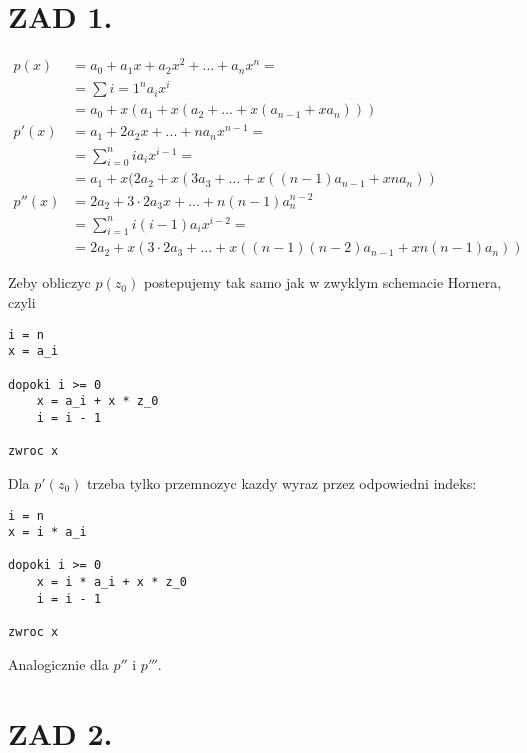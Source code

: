 \documentclass{article}[13pt]
\begin{document}
    \section*{ZAD 1.}
    \begin{align*}
        p(x)&=a_0+a_1x+a_2x^2+...+a_nx^n=\\
            &=\sum\limits{i=1}^na_ix^i\\
            &=a_0+x(a_1+x(a_2+...+x(a_{n-1}+xa_n)))\\
        p'(x)&=a_1+2a_2x+...+na_nx^{n-1}=\\
            &=\sum\limits_{i=0}^nia_ix^{i-1}=\\
            &=a_1+x(2a_2+x(3a_3+...+x((n-1)a_{n-1}+xna_n))\\
        p''(x)&=2a_2+3\cdot2a_3x+...+n(n-1)a_n^{n-2}\\
            &=\sum\limits_{i=1}^ni(i-1)a_ix^{i-2}=\\
            &=2a_2+x(3\cdot2a_3+...+x((n-1)(n-2)a_{n-1}+xn(n-1)a_n))
    \end{align*}

    Zeby obliczyc $p(z_0)$ postepujemy tak samo jak w zwyklym schemacie Hornera, czyli
\begin{lstlisting}
i = n
x = a_i

dopoki i >= 0
    x = a_i + x * z_0
    i = i - 1

zwroc x
\end{lstlisting}

    Dla $p'(z_0)$ trzeba tylko przemnozyc kazdy wyraz przez odpowiedni indeks:

\begin{lstlisting}
i = n
x = i * a_i

dopoki i >= 0
    x = i * a_i + x * z_0
    i = i - 1

zwroc x
\end{lstlisting}

    Analogicznie dla $p''$ i $p'''$.

    \section*{ZAD 2.}

    
\end{document}
